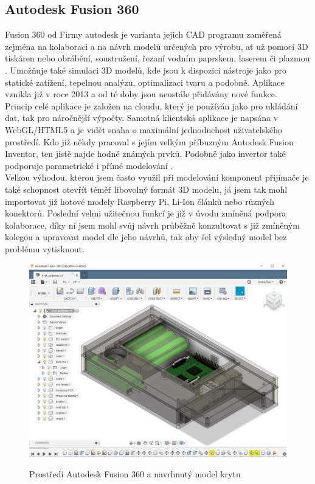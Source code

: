 \documentclass{ctuthesis}
\begin{document}
\subsection{Autodesk Fusion 360}
Fusion 360 od Firmy autodesk je varianta jejich CAD programu zaměřená zejména na kolaboraci a na návrh modelů určených pro výrobu, ať už pomocí 3D tiskáren nebo obrábění, soustružení, řezaní vodním paprskem, laserem či plazmou \cite{autodesk2018}. Umožňuje také simulaci 3D modelů, kde jsou k dispozici nástroje jako pro statické zatížení, tepelnou analýzu, optimalizaci tvaru a podobně. Aplikace vznikla již v roce 2013 a od té doby jsou neustále přidávány nové funkce. \\
Princip celé aplikace je založen na cloudu, který je používán jako pro ukládání dat, tak pro náročnější výpočty. Samotná klientská aplikace je napsána v WebGL/HTML5 a je vidět snaha o maximální jednoduchost uživatelského prostředí. Kdo již někdy pracoval s jejím velkým příbuzným Autodesk Fusion Inventor, ten jistě najde hodně známých prvků. Podobně jako invertor také podporuje parametrické i přímé modelování \cite{cadstudio}. \\
Velkou výhodou, kterou jsem často využil při modelování komponent přijímače je také schopnost otevřít téměř libovolný formát 3D modelu, já jsem tak mohl importovat již hotové modely Raspberry Pi, Li-Ion článků nebo různých konektorů. Poslední velmi užitečnou funkcí je již v úvodu zmíněná podpora kolaborace, díky ní jsem mohl svůj návrh průběžně konzultovat s již zmíněným kolegou a upravovat model dle jeho návrhů, tak aby šel výsledný model bez problému vytisknout.
\begin{figure}
\caption{Prostředí Autodesk Fusion 360 a navrhnutý model krytu}
\includegraphics[width=1\textwidth]{./images/3dmodel.png}
\label{3dmodel}
\end{figure}
\end{document}
